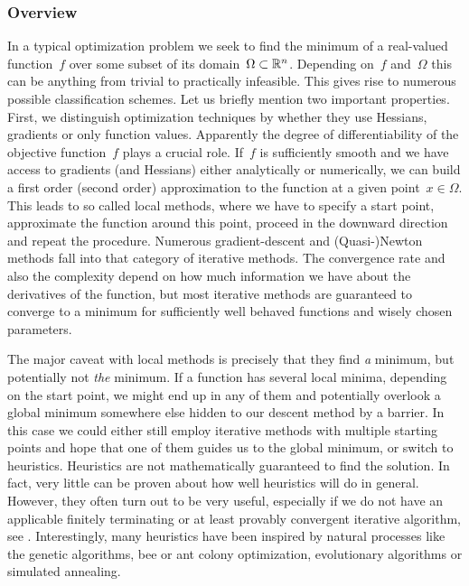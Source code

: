 \subsubsection{Overview}

In a typical optimization problem we seek to find the minimum of a real-valued
function~$f$ over some subset of its domain~$\Omega \subset \mathbb{R}^n$. Depending
on~$f$ and~$\Omega$ this can be anything from trivial to practically infeasible.
This gives rise to numerous possible classification schemes. Let us briefly
mention two important properties. First, we distinguish optimization techniques
by whether they use Hessians, gradients or only function values. Apparently the
degree of differentiability of the objective function~$f$ plays a crucial role.
If~$f$ is sufficiently smooth and we have access to gradients (and Hessians)
either analytically or numerically, we can build a first order (second order)
approximation to the function at a given point~$x \in \Omega$. This leads to so
called local methods, where we have to specify a start point, approximate the
function around this point, proceed in the downward direction and repeat the
procedure. Numerous gradient-descent and (Quasi-)Newton methods fall into that
category of iterative methods. The convergence rate and also the complexity
depend on how much information we have about the derivatives of the function,
but most iterative methods are guaranteed to converge to a minimum for
sufficiently well behaved functions and wisely chosen parameters.

The major caveat with local methods is precisely that they find \emph{a}
minimum, but potentially not \emph{the} minimum. If a function has several local
minima, depending on the start point, we might end up in any of them and
potentially overlook a global minimum somewhere else hidden to our descent
method by a barrier. In this case we could either still employ iterative methods
with multiple starting points and hope that one of them guides us to the global
minimum, or switch to heuristics. Heuristics are not mathematically guaranteed
to find the solution. In fact, very little can be proven about how well
heuristics will do in general. However, they often turn out to be very useful,
especially if we do not have an applicable finitely terminating or at least
provably convergent iterative algorithm, see .
Interestingly, many heuristics have been inspired by natural processes like the
genetic algorithms, bee or ant colony optimization, evolutionary algorithms or
simulated annealing.

